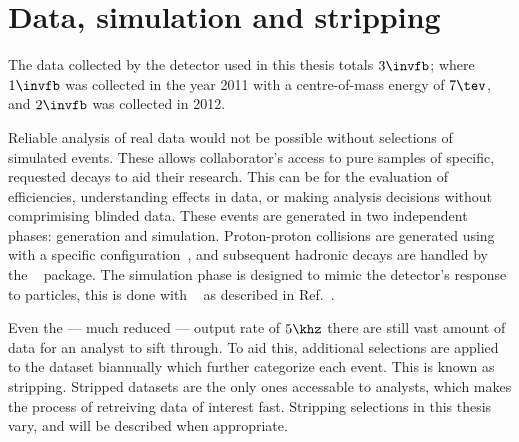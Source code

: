 \section{Data, simulation and stripping}

The data collected by the \lhcb detector used in this thesis totals $3\invfb$; where $1\invfb$ was
collected in the year 2011 with a centre-of-mass energy of $7\tev$, and $2\invfb$ was collected in
2012.

Reliable analysis of real data would not be possible without selections of simulated events.
These allows collaborator's access to pure samples of specific, requested decays to aid their
research.
This can be for the evaluation of efficiencies, understanding effects in data, or making analysis
decisions without comprimising blinded data.
These events are generated in two independent phases: generation and simulation.
Proton-proton collisions are generated using \pythia~\cite{Sjostrand:2006za,*Sjostrand:2007gs}
with a specific \lhcb configuration~\cite{LHCb-PROC-2010-056},
and subsequent hadronic decays are handled by the \evtgen~\cite{Lange:2001uf} package.
The simulation phase is designed to mimic the \lhcb detector's response to particles, this is done
with \geant~\cite{Allison:2006ve,*Agostinelli:2002hh} as described in
Ref.~\cite{LHCb-PROC-2011-006}.

Even the --- much reduced --- output rate of $5\khz$ there are still vast amount of data for an
analyst to sift through.
To aid this, additional selections are applied to the dataset biannually which further categorize
each event.
This is known as stripping.
Stripped datasets are the only ones accessable to analysts, which makes the process of retreiving
data of interest fast.
Stripping selections in this thesis vary, and will be described when appropriate.













